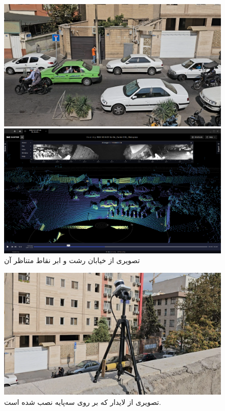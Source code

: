 \begin{figure}[h!]
    \centering
    \begin{minipage}{0.8\textwidth}
        \includegraphics[width=1\linewidth]{figures/Rasht_Lidar_Frame.png}
    \end{minipage}
    \vspace{0.3cm}
    \begin{minipage}{0.8\textwidth}
        \includegraphics[width=1\linewidth]{figures/Video_Rasht_Frame.png}
    \end{minipage}
    \caption{تصویری از خیابان رشت و ابر نقاط متناظر آن}
    \label{fig:Data_Acquistion_Comparison}
\end{figure}

\begin{figure}[h!]
    \centering
    \includegraphics[width=0.75\linewidth]{figures/Lidar_Data_Acquisition2.png}
    \caption{تصویری از لایدار  که بر روی سه‌پایه نصب شده است.}
    \label{fig:Lidar_Data_Acquisition}
\end{figure}

